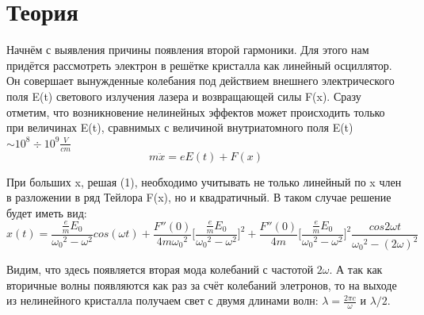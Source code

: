 \documentclass[a4paper,10pt]{extarticle} %
\begin{document}


\newpage

\section{Теория}
Начнём с выявления причины появления второй гармоники. Для этого нам придётся рассмотреть электрон в решётке кристалла как линейный осциллятор. Он совершает вынужденные колебания под действием внешнего электрического поля E(t) светового излучения лазера и возвращающей силы F(x). Сразу отметим, что возникновение нелинейных эффектов может происходить только при величинах E(t), сравнимых с величиной внутриатомного поля E(t) $\sim 10^8 \div 10^9 \frac{V}{cm}$
\begin{equation}
m \ddot{x} = e E(t) + F(x)
\end{equation}

При больших x, решая (1), необходимо учитывать не только линейный по x член в разложении в  ряд Тейлора F(x), но и квадратичный. В таком случае решение будет иметь вид:
\begin{equation}
x(t) = \frac{\frac{e}{m} E_0}{{\omega_0}^2 - {\omega}^2} cos(\omega t) 
+ \frac{F''(0)}{4m {\omega_0}^2} \Big[\frac{\frac{e}{m} E_0}{{\omega_0}^2 - {\omega}^2}\Big]^2
+ \frac{F''(0)}{4m} \Big[\frac{\frac{e}{m} E_0}{{\omega_0}^2 - {\omega}^2}\Big]^2
\frac{cos2\omega t}{{\omega_0}^2 - (2 \omega)^2}
\end{equation}

Видим, что здесь появляется вторая мода колебаний с частотой $2 \omega$. А так как вторичные волны появляются как раз за счёт колебаний элетронов, то на выходе из нелинейного кристалла получаем свет с двумя длинами волн: $\lambda = \frac{2 \pi c}{\omega}$ и $\lambda / 2$.\\
\end{document}
